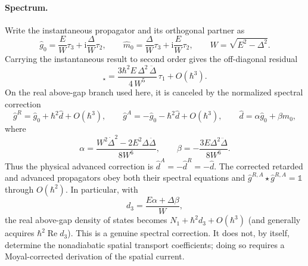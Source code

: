 \documentclass[
  aps,
  prb,
  preprint,
  superscriptaddress,
  longbibliography,
  nofootinbib
]{revtex4-2}
\newcommand{\ii}{\mathrm{i}}
\newcommand{\DOS}{N_1}
\providecommand{\openone}{}\renewcommand{\openone}{\mathds{1}}
\newcommand{\Real}{\operatorname{Re}}
\begin{document}
\paragraph{Spectrum.} Write the instantaneous propagator and its orthogonal
partner as
\begin{equation}
  \hat g_0=\frac{E}{W}\tau_3+\ii\frac{\Delta}{W}\tau_2,
  \qquad
  \hat m_0=\frac{\Delta}{W}\tau_3+\ii\frac{E}{W}\tau_2,
  \qquad W=\sqrt{E^2-\Delta^2}.
  \label{eq:nonad_basis}
\end{equation}
Carrying the instantaneous result to second order gives the off-diagonal
residual
\begin{equation}
  [L_0,\hat g_0]_\star
  =\frac{3\hbar^2 E\,\Delta^2\,\ddot\Delta}{4\,W^5}\,\tau_1+O(\hbar^3).
  \label{eq:nonad_residual}
\end{equation}
On the real above-gap branch used here, it is canceled by the normalized
spectral correction
\begin{equation}
  \hat g^R=\hat g_0+\hbar^2\hat d+O(\hbar^3),
  \qquad
  \hat g^A=-\hat g_0-\hbar^2\hat d+O(\hbar^3),
  \qquad
  \hat d=\alpha\hat g_0+\beta\hat m_0,
  \label{eq:nonad_spectral_correction}
\end{equation}
where
\begin{equation}
  \alpha=\frac{W^2\dot\Delta^2-2E^2\Delta\ddot\Delta}{8W^6},
  \qquad
  \beta=-\frac{3E\Delta^2\ddot\Delta}{8W^6}.
  \label{eq:nonad_coefficients}
\end{equation}
Thus the physical advanced correction is \(\hat d^A=-\hat d^R=-\hat d\).
The corrected retarded and advanced propagators obey both their spectral
equations and \(\hat g^{R,A}\star\hat g^{R,A}=\openone\) through
\(O(\hbar^2)\). In particular, with
\begin{equation}
  d_3=\frac{E\alpha+\Delta\beta}{W},
\end{equation}
the real above-gap density of states becomes
\(\DOS+\hbar^2d_3+O(\hbar^3)\) (and generally acquires
\(\hbar^2\Real d_3\)). This is a genuine spectral correction. It does not,
by itself, determine the nonadiabatic spatial transport coefficients; doing
so requires a Moyal-corrected derivation of the spatial current.
\end{document}
